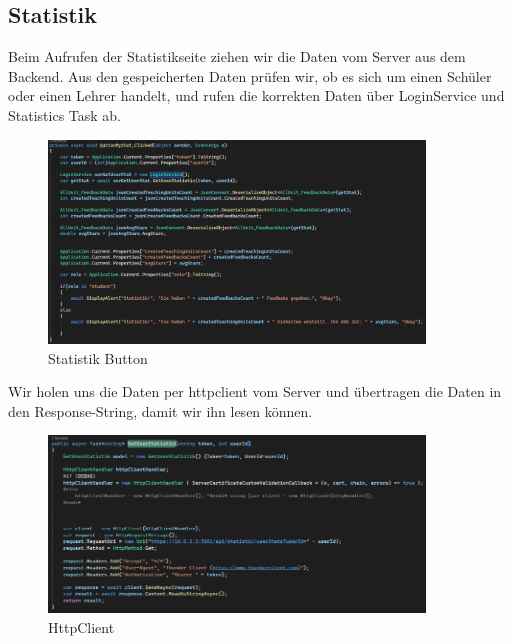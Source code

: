 \subsection{Statistik}
Beim Aufrufen der Statistikseite ziehen wir die Daten vom Server aus dem Backend.
Aus den gespeicherten Daten prüfen wir, ob es sich um einen Schüler oder einen Lehrer handelt, und rufen die korrekten Daten über LoginService und Statistics Task ab.
\begin{figure}[h]
    \begin{center}\includegraphics[width=10cm]{pics/Xamarin Frontend/statistic.png}
    \caption[Statistik]{Statistik Button}
    \end{center}
\end{figure}
\newline
Wir holen uns die Daten per httpclient vom Server und übertragen die Daten in den Response-String, damit wir ihn lesen können.
\begin{figure}[h]
    \begin{center}\includegraphics[width=10cm]{pics/Xamarin Frontend/stat http.png}
    \caption[Statistik]{HttpClient}
    \end{center}
\end{figure}
